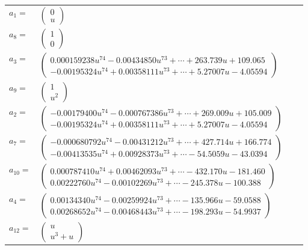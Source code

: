 \documentclass[1p]{elsarticle_modified}
\theoremstyle{definition}
\begin{document}
\begin{tabular}{m{7pt} m{180pt} m{7pt} m{180pt} }
\flushright $a_{1}=$&$\begin{pmatrix}0\\u\end{pmatrix}$ \\
\flushright $a_{8}=$&$\begin{pmatrix}1\\0\end{pmatrix}$ \\
\flushright $a_{3}=$&$\begin{pmatrix}0.000159238 u^{74}-0.00434850 u^{73}+\cdots+263.739 u+109.065\\-0.00195324 u^{74}+0.00358111 u^{73}+\cdots+5.27007 u-4.05594\end{pmatrix}$ \\
\flushright $a_{9}=$&$\begin{pmatrix}1\\u^2\end{pmatrix}$ \\
\flushright $a_{2}=$&$\begin{pmatrix}-0.00179400 u^{74}-0.000767386 u^{73}+\cdots+269.009 u+105.009\\-0.00195324 u^{74}+0.00358111 u^{73}+\cdots+5.27007 u-4.05594\end{pmatrix}$ \\
\flushright $a_{7}=$&$\begin{pmatrix}-0.000680792 u^{74}-0.00431212 u^{73}+\cdots+427.714 u+166.774\\-0.00413535 u^{74}+0.00928373 u^{73}+\cdots-54.5059 u-43.0394\end{pmatrix}$ \\
\flushright $a_{10}=$&$\begin{pmatrix}0.000787410 u^{74}+0.00462093 u^{73}+\cdots-432.170 u-181.460\\0.00222760 u^{74}-0.00102269 u^{73}+\cdots-245.378 u-100.388\end{pmatrix}$ \\
\flushright $a_{4}=$&$\begin{pmatrix}0.00134340 u^{74}-0.00259924 u^{73}+\cdots-135.966 u-59.0588\\0.00268652 u^{74}-0.00468443 u^{73}+\cdots-198.293 u-54.9937\end{pmatrix}$ \\
\flushright $a_{12}=$&$\begin{pmatrix}u\\u^3+u\end{pmatrix}$ \\

\end{tabular}
\end{document}
